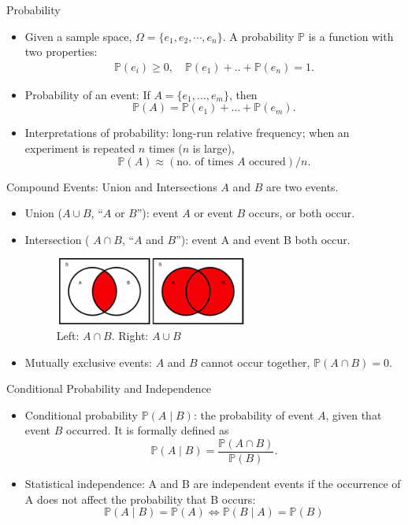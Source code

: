 \documentclass{beamer}
\newcommand{\pr}{\mathbb{P}}
\begin{document}
\begin{frame}{Probability}
    \begin{itemize}
        \item Given a sample space, $\Omega=\{e_1,e_2,\cdots,e_n\}$. A probability 
$\pr$  is a function with two properties: 
\begin{align*}
    \pr(e_i)\geq0, \quad \pr(e_1)+ .. + \pr(e_n)=1.
\end{align*}

\item Probability of an event: If $A=\{e_1,\dots,e_m\}$, then
 $$\pr(A)=\pr(e_1) + \dots + \pr (e_m).$$

\item Interpretations of probability: long-run relative frequency; when an  experiment is repeated $n$  times ($n$ is large),
$$\pr(A) \approx (\text{no. of times }A\text{ occured})/n.$$

    \end{itemize}
\end{frame}

\begin{frame}{Compound Events: Union and Intersections}
$A$ and $B$ are two events.
\begin{itemize}
\item Union ($A \cup B$, ``$A$ or $B$''): event $A$ or event $B$ occurs, or both occur. 
\item Intersection ( $A \cap B$, ``$A$ and $B$''): event A and event B both occur.
\begin{center}
\begin{figure}\caption{Left: $A\cap B$. Right: $A\cup B$}
\includegraphics[width=0.6\textwidth]{figures/venn-intersection-union}
\end{figure}\end{center}
\item Mutually exclusive events: $A$ and $B$  cannot occur together, $ \pr(A\cap B)=0$.
\end{itemize}


\end{frame}

\begin{frame}{Conditional Probability and Independence}
    \begin{itemize}
        \item Conditional probability $\pr(A \mid B)$:  the probability of event $A$, given that event $B$ occurred. It is formally defined as 
$$\pr(A\mid B) = \frac{\pr(A \cap B)}{\pr(B)}.$$
\item Statistical independence: A and B are independent events if the occurrence of A does not affect the probability that B occurs:
$$\pr(A \mid B)=\pr(A) \iff\pr(B \mid A)=\pr(B)$$
\end{itemize}
\end{frame}
\end{document}
